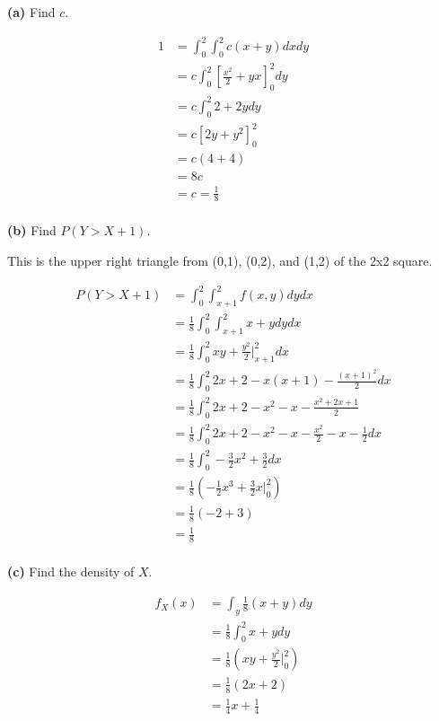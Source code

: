 \documentclass[11pt]{article}
\begin{document}
\textbf{(a)} Find \(c\).


\begin{align*}
	1 &=  \int_{0}^{2}\int_{0}^{2}c(x+y)dxdy \\
	  &=  c \int_{0}^{2} [\frac{x^{2}}{2} + yx]_{0}^{2} dy\\
	  &= c \int_{0}^{2} 2 + 2y dy \\
	  &= c [2y + y^{2}]_{0}^{2} \\
	  &= c(4 + 4) \\
	  &= 8c \\
	  &= c = \frac{1}{8} \\
\end{align*}



\textbf{(b)} Find \(P(Y > X+1)\).

This is the upper right triangle from (0,1), (0,2), and (1,2) of the 2x2 square. 

\begin{align*}
	P(Y > X + 1) &= \int_{0}^{2} \int_{x+1}^{2} f(x,y) dydx \\
	&= \frac{1}{8} \int_{0}^{2} \int_{x+1}^{2} x + y dydx \\
	&= \frac{1}{8} \int_{0}^{2} xy + \frac{y^{2}}{2} \vert _{x+1}^{2} dx \\
	&=\frac{1}{8} \int_{0}^{2} 2x + 2 - x(x+1) - \frac{(x+1)^{2}}{2} dx  \\
	&= \frac{1}{8} \int_{0}^{2} 2x + 2 -x^{2} - x - \frac{x^{2} + 2x +1}{2} \\
	&= \frac{1}{8} \int_{0}^{2} 2x + 2 -x^{2} - x - \frac{x^{2}}{2} -x -\frac{1}{2}dx \\
	&= \frac{1}{8} \int_{0}^{2} -\frac{3}{2}x^{2} + \frac{3}{2} dx \\
	&= \frac{1}{8} (-\frac{1}{2}x^{3} + \frac{3}{2}x \vert_{0}^{2}) \\ 
	&=  \frac{1}{8} (-2 + 3) \\
	&= \frac{1}{8} \\
\end{align*}



\textbf{(c)} Find the density of \(X\).

\begin{align*}
	f_{X}(x) &= \int_{y} \frac{1}{8}(x+y)dy  \\
	&= \frac{1}{8} \int_{0}^{2} x + y dy \\
	&= \frac{1}{8} ( xy + \frac{y^{2}}{2} \vert _{0}^{2} ) \\
	&= \frac{1}{8} (2x + 2) \\
	&= \frac{1}{4}x + \frac{1}{4} \\
\end{align*}
\end{document}
